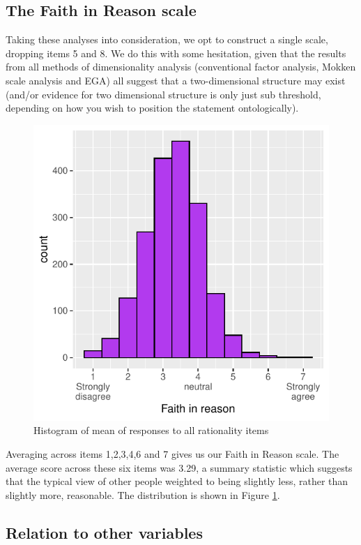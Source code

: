 \documentclass[
  ,jou,floatsintext]{apa6}
\begin{document}
\hypertarget{the-faith-in-reason-scale}{%
\subsection{The Faith in Reason scale}\label{the-faith-in-reason-scale}}

Taking these analyses into consideration, we opt to construct a single scale, dropping items 5 and 8. We do this with some hesitation, given that the results from all methods of dimensionality analysis (conventional factor analysis, Mokken scale analysis and EGA) all suggest that a two-dimensional structure may exist (and/or evidence for two dimensional structure is only just sub threshold, depending on how you wish to position the statement ontologically).

\begin{figure}

{\centering \includegraphics[width=0.75\linewidth]{faithinreason_files/figure-latex/meanhistogram-1} 

}

\caption{Histogram of mean of responses to all rationality items}\label{fig:meanhistogram}
\end{figure}

Averaging across items 1,2,3,4,6 and 7 gives us our Faith in Reason scale. The average score across these six items was 3.29, a summary statistic which suggests that the typical view of other people weighted to being slightly less, rather than slightly more, reasonable. The distribution is shown in Figure \ref{fig:meanhistogram}.

\hypertarget{relation-to-other-variables}{%
\subsection{Relation to other variables}\label{relation-to-other-variables}}
\end{document}
